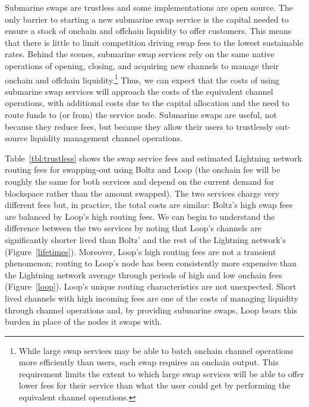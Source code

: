 \documentclass[10pt,twocolumn]{article}
\begin{document}
Submarine swaps are trustless and some implementations are open source.
The only barrier to starting a new submarine swap service is
the capital needed to ensure a stock of onchain and offchain liquidity
to offer customers.
This means that there is little to limit competition
driving swap fees to the lowest sustainable rates.
Behind the scenes,
submarine swap services rely on the same native operations of
opening, closing, and acquiring new channels to manage
their onchain and offchain liquidity.\footnote{
	While large swap services may be able to batch
	onchain channel operations more efficiently than users,
	each swap requires an onchain output.
	This requirement limits the extent to which
	large swap services will be able to offer lower
	fees for their service than what the user could
	get by performing the equivalent channel operations.
}
Thus, we can expect that the costs of using
submarine swap services will approach the costs
of the equivalent channel operations,
with additional costs due to the capital allocation
and the need
to route funds to (or from) the service node.
Submarine swaps are useful, not because they reduce fees,
but because they
allow their users to trustlessly out-source
liquidity management channel operations.

Table~\ref{tbl:trustless} shows the swap service fees and
estimated Lightning network routing fees for
swapping-out using Boltz and Loop
(the onchain fee will be roughly
the same for both services and depend on
the current demand for blockspace
rather than the amount swapped).
The two services charge very different fees
but, in practice, the total costs are similar:
Boltz's high swap fees are balanced by Loop's high routing fees.
We can begin to understand the difference between the two services
by noting that Loop's channels are significantly shorter lived
than Boltz' and the rest of the Lightning network's (Figure~\ref{lifetimes}).
Moreover, Loop's high routing fees are not a transient phenomenon;
routing to Loop's node has been consistently more expensive than
the Lightning network average through periods of high and low onchain fees
(Figure~\ref{loop}).
Loop's unique routing characteristics are not unexpected.
Short lived channels with high incoming fees
are one of the costs of managing liquidity through channel operations
and, by providing submarine swaps,
Loop bears this burden in place of the nodes it swaps with.
\end{document}
